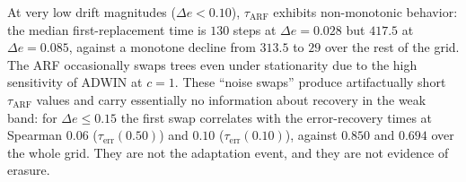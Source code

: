 \documentclass[smallextended]{svjour3}
\begin{document}
\begin{remark}\label{rem:bgswap}
  At very low drift magnitudes ($\Delta e < 0.10$), $\tau_{\mathrm{ARF}}$ exhibits non-monotonic behavior: the median first-replacement time is $130$ steps at $\Delta e = 0.028$ but $417.5$ at $\Delta e = 0.085$, against a monotone decline from $313.5$ to $29$ over the rest of the grid. The ARF occasionally swaps trees even under stationarity due to the high sensitivity of ADWIN at $c = 1$.
  These ``noise swaps'' produce artifactually short $\tau_{\mathrm{ARF}}$ values and carry essentially no information about recovery in the weak band: for $\Delta e \le 0.15$ the first swap correlates with the error-recovery times at Spearman $0.06$ ($\tau_{\mathrm{err}}(0.50)$) and $0.10$ ($\tau_{\mathrm{err}}(0.10)$), against $0.850$ and $0.694$ over the whole grid. They are not the adaptation event, and they are not evidence of erasure.
\end{remark}
\end{document}
